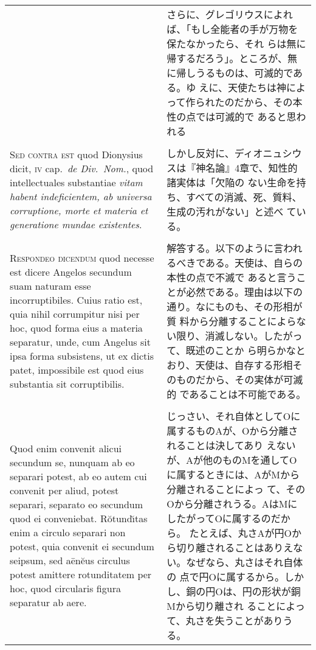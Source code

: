 \documentclass[10pt]{jsarticle} %
\begin{document}
\begin{longtable}{p{21em}p{21em}}
&
さらに、グレゴリウスによれば、「もし全能者の手が万物を保たなかったら、それ
 らは無に帰するだろう」。ところが、無に帰しうるものは、可滅的である。ゆ
 えに、天使たちは神によって作られたのだから、その本性の点では可滅的で
 あると思われる

\\\\


{\scshape Sed contra est} quod Dionysius dicit, {\scshape iv}
cap.~{\itshape de Div.~Nom.}, quod intellectuales substantiae {\itshape
vitam habent indeficientem, ab universa corruptione, morte et materia et
generatione mundae existentes}.


&
しかし反対に、ディオニュシウスは『神名論』4章で、知性的諸実体は「欠陥の
 ない生命を持ち、すべての消滅、死、質料、生成の汚れがない」と述べ
 ている。

\\\\


{\scshape Respondeo dicendum} quod necesse est dicere
Angelos secundum suam naturam esse incorruptibiles. Cuius ratio est,
quia nihil corrumpitur nisi per hoc, quod forma eius a materia
separatur, unde, cum Angelus sit ipsa forma subsistens, ut ex dictis
patet, impossibile est quod eius substantia sit corruptibilis. 


&

解答する。以下のように言われるべきである。天使は、自らの本性の点で不滅で
 あると言うことが必然である。理由は以下の通り。なにものも、その形相が質
 料から分離することによらない限り、消滅しない。したがって、既述のことか
 ら明らかなとおり、天使は、自存する形相そのものだから、その実体が可滅的
 であることは不可能である。


\\\\

Quod enim
convenit alicui secundum se, nunquam ab eo separari potest, ab eo autem
cui convenit per aliud, potest separari, separato eo secundum quod ei
conveniebat. R\u{o}tund\u{\i}tas enim a circulo separari non potest, quia
convenit ei secundum seipsum, sed a\={e}n\u{e}us circulus potest amittere
rotunditatem per hoc, quod circularis figura separatur ab aere. 

&

じっさい、それ自体としてOに属するものAが、Oから分離されることは決してあり
 えないが、Aが他のものMを通してOに属するときには、AがMから分離されることによっ
 て、そのOから分離されうる。AはMにしたがってOに属するのだから。
たとえば、丸さAが円Oから切り離されることはありえない。なぜなら、丸さはそれ自体の
 点で円Oに属するから。しかし、銅の円Oは、円の形状が銅Mから切り離され
 ることによって、丸さを失うことがありうる。


\end{longtable}
\end{document}
